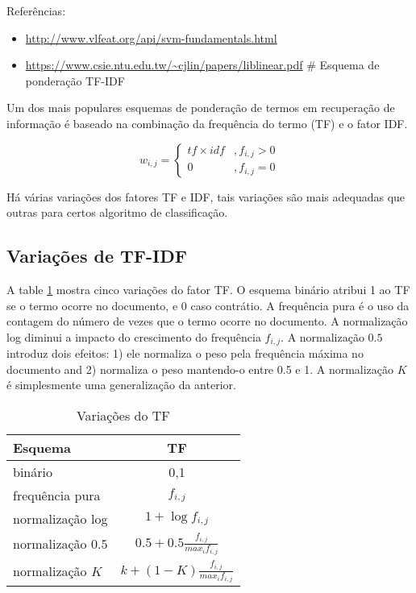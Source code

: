 \documentclass[]{article}
\begin{document}
Referências:

\begin{itemize}
\itemsep1pt\parskip0pt
\item
  \url{http://www.vlfeat.org/api/svm-fundamentals.html}
\item
  \url{https://www.csie.ntu.edu.tw/~cjlin/papers/liblinear.pdf} \#
  Esquema de ponderação TF-IDF
\end{itemize}

Um dos mais populares esquemas de ponderação de termos em recuperação de
informação é baseado na combinação da frequência do termo (TF) e o fator
IDF.

\begin{equation}
    w_{i,j}=\left\{
                \begin{array}{ll}
                  tf \times idf &, f_{i,j} > 0\\
                  0 &, f_{i,j} = 0
                \end{array}
              \right.
\end{equation}

Há várias variações dos fatores TF e IDF, tais variações são mais
adequadas que outras para certos algoritmo de classificação.

\subsection{Variações de TF-IDF}\label{variacoes-de-tf-idf}

A table \ref{tab:tfs} mostra cinco variações do fator TF. O esquema
binário atribui 1 ao TF se o termo ocorre no documento, e 0 caso
contrátio. A frequência pura é o uso da contagem do número de vezes que
o termo ocorre no documento. A normalização log diminui a impacto do
crescimento do frequência \(f_{i,j}\). A normalização \(0.5\) introduz
dois efeitos: 1) ele normaliza o peso pela frequência máxima no
documento and 2) normaliza o peso mantendo-o entre 0.5 e 1. A
normalização \(K\) é simplesmente uma generalização da anterior.

\begin{table}[ht]
\centering
\begin{tabular}{|lc|}
\hline
  Esquema & TF\\ 
\hline
binário & {0,1}\\
frequência pura & $f_{i,j}$\\
normalização log & $1 + \log f_{i,j}$\\
normalização $0.5$ & $0.5 + 0.5  \frac{f_{i,j}}{max_if_{i,j}}$\\
normalização $K$ & $k + (1-K) \frac{f_{i,j}}{max_if_{i,j}}$\\
\hline
\end{tabular}
\caption{Variações do TF}
\label{tab:tfs}
\end{table}
\end{document}
